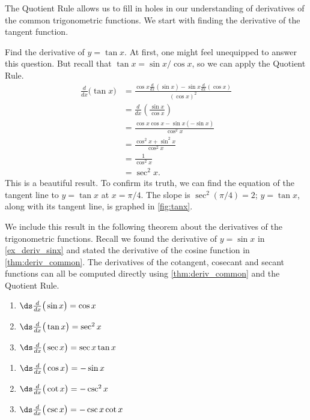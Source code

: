 The Quotient Rule allows us to fill in holes in our understanding of derivatives of the common trigonometric functions. We start with finding the derivative of the tangent function.

{Find the derivative of $y=\tan x$.}
{At first, one might feel unequipped to answer this question. But recall that $\tan x = \sin x/\cos x$, so we can apply the Quotient Rule.
\begin{align*}
	\frac{d}{dx}\Big(\tan x\Big)
	& = \frac{\cos x\frac{d}{dx}(\sin x)-\sin x\frac{d}{dx}(\cos x)}{(\cos x)^2} \\
	&= \frac{d}{dx}\left(\frac{\sin x}{\cos x}\right) \\
	&= \frac{\cos x \cos x - \sin x (-\sin x)}{\cos^2 x} \\
	&= \frac{\cos^2x+\sin^2x}{\cos^2x}\\
	&= \frac{1}{\cos^2x} \\
	&= \sec ^2 x.
\end{align*}
This is a beautiful result. To confirm its truth, we can find the equation of the tangent line to $y=\tan x$ at $x=\pi/4$. The slope is $\sec^2(\pi/4) = 2$; $y=\tan x$, along with its tangent line, is graphed in \autoref{fig:tanx}.
}

We include this result in the following theorem about the derivatives of the trigonometric functions. Recall we found the derivative of $y=\sin x$ in \autoref{ex_deriv_sinx} and stated the derivative of the cosine function in \autoref{thm:deriv_common}. The derivatives of the cotangent, cosecant and secant functions can all be computed directly using \autoref{thm:deriv_common} and the Quotient Rule.

{\noindent\begin{minipage}[t]{.5\specialboxlength}
	\begin{enumerate}
		\item	$\ds \frac{d}{dx}\big(\sin x\big) = \cos x$\addtocounter{enumi}{1}
		\item	$\ds \frac{d}{dx}\big(\tan x\big) = \sec^2 x$\addtocounter{enumi}{1}
		\item	$\ds \frac{d}{dx}\big(\sec x\big) = \sec x\tan x$\addtocounter{enumi}{1}
	\end{enumerate}
\end{minipage}%
\begin{minipage}[t]{.5\specialboxlength}
	\begin{enumerate}\addtocounter{enumi}{1}
		\item	$\ds \frac{d}{dx}\big(\cos x\big) = -\sin x$\addtocounter{enumi}{1}
		\item	$\ds \frac{d}{dx}\big(\cot x\big) = -\csc^2 x$\addtocounter{enumi}{1}
		\item	$\ds \frac{d}{dx}\big(\csc x\big) = -\csc x\cot x$
	\end{enumerate}
\end{minipage}}

